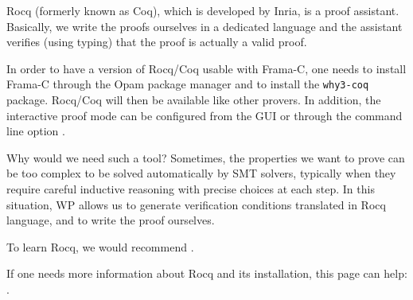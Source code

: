 Rocq (formerly known as Coq), which is developed by Inria, is a proof assistant.
Basically, we write the proofs ourselves in a dedicated language and the
assistant verifies (using typing) that the proof is actually a valid proof.


In order to have a version of Rocq/Coq usable with Frama-C, one needs to install
Frama-C through the Opam package manager and to install the \texttt{why3-coq}
package. Rocq/Coq will then be available like other provers. In addition, the
interactive proof mode can be configured from the GUI or through the command line
option .


Why would we need such a tool? Sometimes, the properties we want to
prove can be too complex to be solved automatically by SMT solvers,
typically when they require careful inductive reasoning with precise
choices at each step. In this situation, WP allows us to generate
verification conditions translated in Rocq language, and to write the
proof ourselves.


To learn Rocq, we would recommend
.


If one needs more information about Rocq and its installation, this page
can help: .
